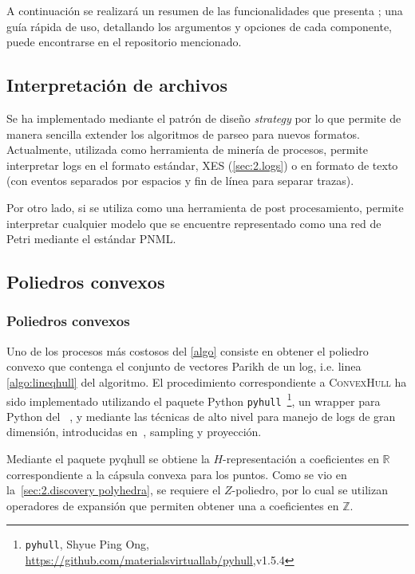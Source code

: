 A continuación se realizará un resumen de las funcionalidades que presenta \pachtool;
una guía rápida de uso, detallando los argumentos y opciones de cada componente,
puede encontrarse en el repositorio mencionado.

\subsection{Interpretación de archivos}
\label{sec:4.parsing}

Se ha implementado mediante el patrón de diseño \textit{strategy} por lo que permite
de manera sencilla extender los algoritmos de parseo para nuevos formatos.
Actualmente, utilizada como herramienta de minería de procesos, permite interpretar 
logs en el formato estándar, XES (\autoref{sec:2.logs}) o en formato de texto (con eventos
separados por espacios y fin de línea para separar trazas).

Por otro lado, si se utiliza \pachtool como una herramienta de post procesamiento, 
permite interpretar cualquier modelo que se encuentre representado
como una red de Petri mediante el estándar PNML.

\subsection{Poliedros convexos}
\label{sec:4.convex_polyhedra}


\subsubsection{Poliedros convexos}
\label{sec:4.qhull}

Uno de los procesos más costosos del \autoref{algo} consiste en obtener el poliedro convexo que contenga 
el conjunto de vectores Parikh de un log, i.e. linea \ref{algo:lineqhull} del algoritmo.
El procedimiento correspondiente a \textsc{ConvexHull} ha sido implementado utilizando el paquete Python
\texttt{pyhull}~\footnote{\texttt{pyhull}, Shyue Ping Ong, \url{https://github.com/materialsvirtuallab/pyhull},v1.5.4}, 
un wrapper para Python del \qhulltool~\cite{Barber96}, y mediante las técnicas de alto nivel para manejo de 
logs de gran dimensión, introducidas en~\cite{CarmonaC14}, sampling y proyección.

Mediante el paquete pyqhull se obtiene la $H$-representación a coeficientes en $\mathbb{R}$ correspondiente a la cápsula convexa
para los puntos. Como se vio en la~\autoref{sec:2.discovery polyhedra}, se requiere el $Z$-poliedro,
por lo cual se utilizan operadores de expansión que permiten obtener una  a coeficientes en $\mathbb{Z}$.

